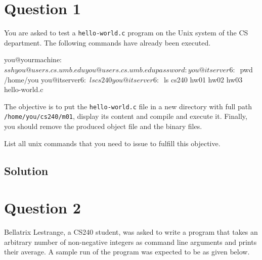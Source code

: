 \documentclass[12pt,letterpaper,twoside]{article}
\begin{document}


\section*{Question 1}

You are asked to test a \texttt{hello-world.c} program on the Unix system of the CS department.
The following commands have already been executed.

\begin{terminal}
you@yourmachine:~$ ssh you@users.cs.umb.edu
you@users.cs.umb.edu password:
you@itserver6:~$ pwd
/home/you
you@itserver6:~$ ls
cs240
you@itserver6:~$ ls cs240
hw01 hw02 hw03 hello-world.c
\end{terminal}

The objective is to put the \texttt{hello-world.c} file in a new directory with full path \texttt{/home/you/cs240/m01}, display its content and compile and execute it.
Finally, you should remove the produced object file and the binary files.

List all unix commands that you need to issue to fulfill this objective.

\subsection*{Solution}


\section*{Question 2}

Bellatrix Lestrange, a CS240 student, was asked to write a program that takes an arbitrary number of non-negative integers as command line arguments and prints their average.
A sample run of the program was expected to be as given below.
\end{document}
